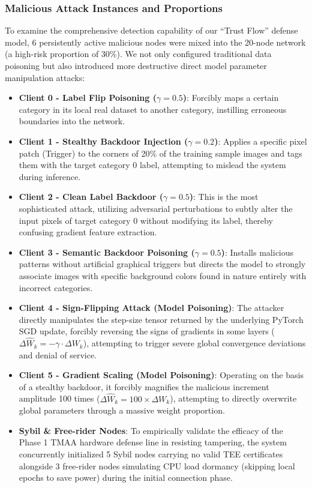 \documentclass[runningheads]{llncs}
\begin{document}
\subsubsection{Malicious Attack Instances and Proportions}
To examine the comprehensive detection capability of our ``Trust Flow'' defense model, 6 persistently active malicious nodes were mixed into the 20-node network (a high-risk proportion of 30\%). We not only configured traditional data poisoning but also introduced more destructive direct model parameter manipulation attacks:
\begin{itemize}
    \item \textbf{Client 0 - Label Flip Poisoning ($\gamma=0.5$)}: Forcibly maps a certain category in its local real dataset to another category, instilling erroneous boundaries into the network.
    \item \textbf{Client 1 - Stealthy Backdoor Injection ($\gamma=0.2$)}: Applies a specific pixel patch (Trigger) to the corners of 20\% of the training sample images and tags them with the target category 0 label, attempting to mislead the system during inference.
    \item \textbf{Client 2 - Clean Label Backdoor ($\gamma=0.5$)}: This is the most sophisticated attack, utilizing adversarial perturbations to subtly alter the input pixels of target category 0 without modifying its label, thereby confusing gradient feature extraction.
    \item \textbf{Client 3 - Semantic Backdoor Poisoning ($\gamma=0.5$)}: Installs malicious patterns without artificial graphical triggers but directs the model to strongly associate images with specific background colors found in nature entirely with incorrect categories.
    \item \textbf{Client 4 - Sign-Flipping Attack (Model Poisoning)}: The attacker directly manipulates the step-size tensor returned by the underlying PyTorch SGD update, forcibly reversing the signs of gradients in some layers ($\Delta \widehat{W}_k = - \gamma \cdot \Delta W_k$), attempting to trigger severe global convergence deviations and denial of service.
    \item \textbf{Client 5 - Gradient Scaling (Model Poisoning)}: Operating on the basis of a stealthy backdoor, it forcibly magnifies the malicious increment amplitude 100 times ($\Delta \widehat{W}_k = 100 \times \Delta W_k$), attempting to directly overwrite global parameters through a massive weight proportion.
    \item \textbf{Sybil \& Free-rider Nodes}: To empirically validate the efficacy of the Phase 1 TMAA hardware defense line in resisting tampering, the system concurrently initialized 5 Sybil nodes carrying no valid TEE certificates alongside 3 free-rider nodes simulating CPU load dormancy (skipping local epochs to save power) during the initial connection phase.
\end{itemize}
\end{document}

